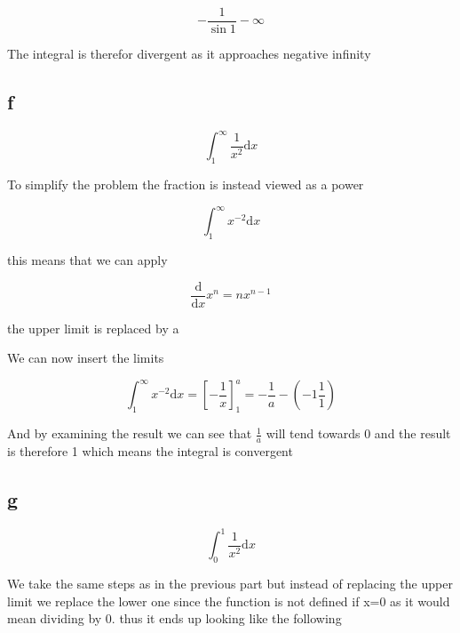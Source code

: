 \documentclass[12pt,a4paper]{article}
\begin{document}
\begin{equation} \label{}
-\frac{1}{\sin{1}}-\infty
\end{equation}

The integral is therefor divergent as it approaches negative infinity 



\subsection{f}


\begin{equation} \label{}
\int_{1}^{\infty}\frac{1}{x^2}\mathrm{d}x
\end{equation}

To simplify the problem the fraction is instead viewed as a power

\begin{equation} \label{}
\int_{1}^{\infty}x^{-2}\mathrm{d}x
\end{equation}

this means that we can apply

\begin{equation} \label{}
\frac{\mathrm{d}}{\mathrm{d}x}x^n=nx^{n-1}
\end{equation}

the upper limit is replaced by a

We can now insert the limits

\begin{equation} \label{}
\int_{1}^{\infty}x^{-2}\mathrm{d}x=\left[-\frac{1}{x}\right]_{1}^{a}=-\frac{1}{a}-(-1\frac{1}{1})
\end{equation}

And by examining the result we can see that \begin{math}
\frac{1}{a}
\end{math} will tend towards 0 and the result is therefore 1 which means the integral is convergent


\subsection{g}
\begin{equation} \label{}
\int_{0}^{1}\frac{1}{x^2}\mathrm{d}x
\end{equation}


We take the same steps as in the previous part but instead of replacing the upper limit we replace the lower one since the function is not defined if x=0 as it would mean dividing by 0. thus it ends up looking like the following
\end{document}
